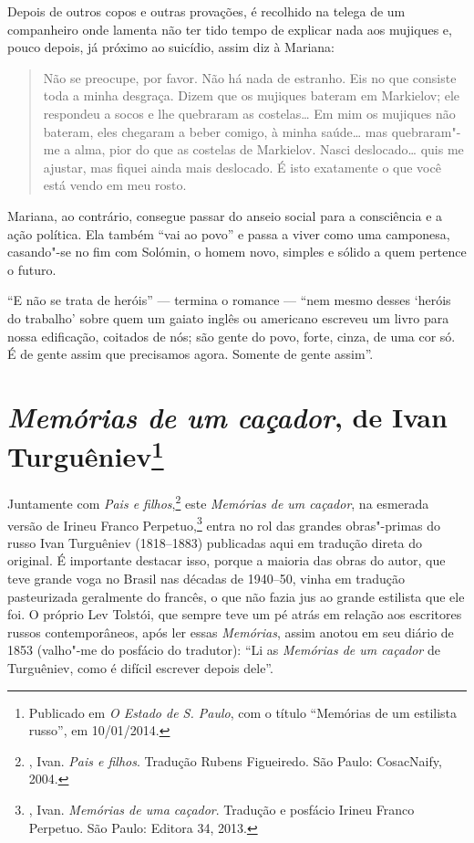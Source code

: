 Depois de outros copos e outras provações, é recolhido na telega de um companheiro onde lamenta não ter tido tempo de explicar nada aos mujiques e, pouco depois, já próximo ao suicídio, assim diz à Mariana:

\begin{quotation}
Não se preocupe, por favor. Não há nada de estranho. Eis no que consiste toda a minha desgraça. Dizem que os mujiques bateram em Markielov; ele respondeu a socos e lhe quebraram as costelas\ldots{} Em mim os mujiques não bateram, eles chegaram a beber comigo, à minha saúde\ldots{} mas quebraram"-me a alma, pior do que as costelas de Markielov. Nasci deslocado\ldots{} quis me
ajustar, mas fiquei ainda mais deslocado. É isto exatamente o que você está vendo em meu rosto.
\end{quotation}

Mariana, ao contrário, consegue passar do anseio social para a consciência e a ação política. Ela também ``vai ao povo'' e passa a
viver como uma camponesa, casando"-se no fim com Solómin, o homem novo, simples e sólido a quem pertence o futuro.

``E não se trata de heróis'' --- termina o romance --- ``nem mesmo desses `heróis do trabalho' sobre quem um gaiato inglês ou americano escreveu um livro para nossa edificação, coitados de nós; são gente do povo, forte, cinza, de uma cor só. É de gente assim que precisamos agora. Somente de gente assim''.

\chapter{\emph{Memórias de um caçador}, de Ivan Turguêniev\footnote{Publicado em \emph{O Estado de S. Paulo}, com o título ``Memórias de um estilista russo'', em 10/01/2014.}}

Juntamente com \emph{Pais e filhos},\footnote{, Ivan. \emph{Pais e filhos}. Tradução Rubens Figueiredo. São Paulo: CosacNaify, 2004.} este \emph{Memórias de um caçador}, na esmerada
versão de Irineu Franco Perpetuo,\footnote{, Ivan. \emph{Memórias de uma caçador}. Tradução e posfácio Irineu Franco Perpetuo. São Paulo: Editora 34, 2013.} entra no rol das grandes
obras"-primas do russo Ivan Turguêniev (1818--1883) publicadas aqui em tradução direta do original. É importante destacar isso, porque a
maioria das obras do autor, que teve grande voga no Brasil nas décadas de 1940--50, vinha em tradução pasteurizada geralmente do francês, o que não fazia jus ao grande estilista que ele foi. O próprio Lev Tolstói,
que sempre teve um pé atrás em relação aos escritores russos contemporâneos, após ler essas \emph{Memórias}, assim anotou em seu
diário de 1853 (valho"-me do posfácio do tradutor): ``Li as \emph{Memórias de um caçador} de Turguêniev, como é difícil escrever depois dele''.

